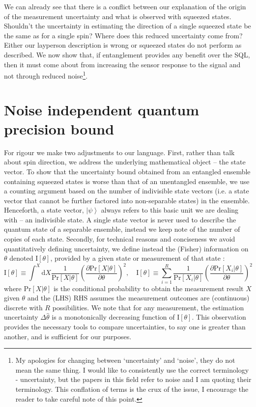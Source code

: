 \documentclass[reqno]{amsart}
\def\be{\begin{equation}}
\def\ee{\end{equation}}
\def\est#1{\hat{#1}}
\newcommand{\ket}[1]{\left| #1 \right>}
\def\func#1#2{\mathrm{#1}\left[#2\right]}
\begin{document}
We can already see that there is a conflict between our explanation of the origin of the measurement uncertainty and what is observed with squeezed states. Shouldn't the uncertainty in estimating the direction of a single squeezed state be the same as for a single spin? Where does this reduced uncertainty come from? Either our layperson description is wrong or squeezed states do not perform as described. We now show that, if entanglement provides any benefit over the SQL, then it must come about from increasing the sensor response to the signal and not through reduced noise\footnote{My apologies for changing between `uncertainty' and `noise', they do not mean the same thing. I would like to consistently use the correct terminology - uncertainty, but the papers in this field refer to noise and I am quoting their terminology. This conflation of terms is the crux of the issue, I encourage the reader to take careful note of this point.}.

\section*{Noise independent quantum precision bound}%
For rigour we make two adjustments to our language. First, rather than talk about spin direction, we address the underlying mathematical object -- the state vector. To show that the uncertainty bound obtained from an entangled ensemble containing squeezed states is worse than that of an unentangled ensemble, we use a counting argument based on the number of indivisible state vectors (i.e. a state vector that cannot be further factored into non-separable states) in the ensemble. Henceforth, a state vector, $\ket{\psi}$ always refers to this basic unit we are dealing with -- an indivisible state. A single state vector is never used to describe the quantum state of a separable ensemble, instead we keep note of the number of copies of each state. Secondly, for technical reasons and conciseness we avoid quantitatively defining uncertainty, we define instead the (Fisher) information on $\theta$ denoted $\func{I}{\theta}$, provided by a given state or measurement of that state \cite{Braunstein1994}:
\be
\func{I}{\theta} \equiv \int^{X} \mathrm{d}X \frac{1}{\func{Pr}{X|\theta}}\left(\frac{\partial \func{Pr}{X|\theta}}{\partial \theta}\right)^2, \quad \func{I}{\theta} \equiv \sum_{i=1}^R \frac{1}{\func{Pr}{X_i|\theta}}\left(\frac{\partial \func{Pr}{X_i|\theta}}{\partial \theta}\right)^2
\label{eq:QFI}
\ee
where $\func{Pr}{X|\theta}$ is the conditional probability to obtain the measurement result $X$ given $\theta$ and the (LHS) RHS assumes the measurement outcomes are (continuous) discrete with $R$ possibilities. We note that for any measurement, the estimation uncertainty $\Delta \est{\theta}$ is a monotonically decreasing function of $\func{I}{\theta}$. This observation provides the necessary tools to compare uncertainties, to say one is greater than another, and is sufficient for our purposes.\\
\end{document}
